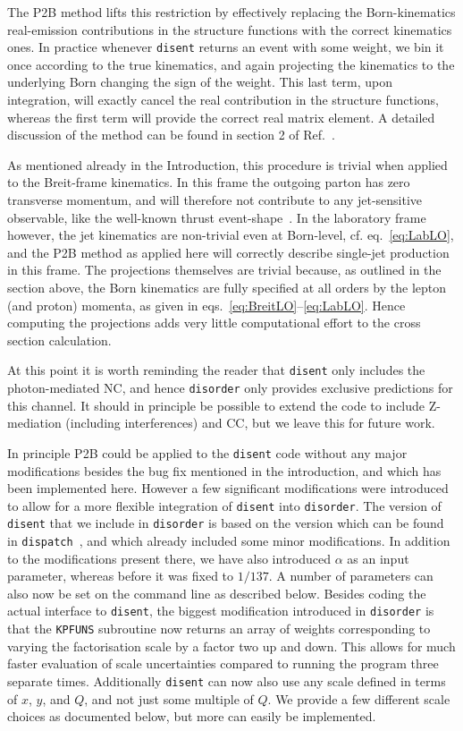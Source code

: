 \documentclass[submission, PhysCodeb]{SciPost_better_arXiv}
\newcommand{\disent}{{\tt disent}}
\newcommand{\disorder}{{\tt disorder}}
\begin{document}
The P2B method lifts this restriction by effectively replacing the
Born-kinematics real-emission contributions in the structure functions
with the correct kinematics ones. In practice whenever \disent{}
returns an event with some weight, we bin it once according to the
true kinematics, and again projecting the kinematics to the underlying
Born changing the sign of the weight. This last term, upon
integration, will exactly cancel the real contribution in the
structure functions, whereas the first term will provide the correct
real matrix element. A detailed discussion of the method can be found
in section 2 of Ref.~\cite{Currie:2018fgr}.

As mentioned already in the Introduction, this procedure is trivial
when applied to the Breit-frame kinematics. In this frame the outgoing
parton has zero transverse momentum, and will therefore not contribute
to any jet-sensitive observable, like the well-known thrust
event-shape~\cite{Antonelli:1999kx}. In the laboratory frame however,
the jet kinematics are non-trivial even at Born-level,
cf. eq.~\eqref{eq:LabLO}, and the P2B method as applied here will
correctly describe single-jet production in this frame. The
projections themselves are trivial because, as outlined in the section
above, the Born kinematics are fully specified at all orders by the
lepton (and proton) momenta, as given in
eqs.~\eqref{eq:BreitLO}--\eqref{eq:LabLO}. Hence computing the
projections adds very little computational effort to the cross section
calculation.

At this point it is worth reminding the reader that \disent{} only
includes the photon-mediated NC, and hence \disorder{} only provides
exclusive predictions for this channel. It should in principle be
possible to extend the code to include Z-mediation (including
interferences) and CC, but we leave this for future work.

In principle P2B could be applied to the \disent{} code without any
major modifications besides the bug fix mentioned in the introduction,
and which has been implemented here. However a few significant
modifications were introduced to allow for a more flexible integration
of \disent{} into \disorder{}. The version of \disent{} that we
include in \disorder{} is based on the version which can be found in
{\tt dispatch}~\cite{Dasgupta:2002dc}, and which already included some
minor modifications. In addition to the modifications present there,
we have also introduced $\alpha$ as an input parameter, whereas before
it was fixed to $1/137$. A number of parameters can also now be set on
the command line as described below. Besides coding the actual
interface to \disent{}, the biggest modification introduced in
\disorder{} is that the {\tt KPFUNS} subroutine now returns an array
of weights corresponding to varying the factorisation scale by a
factor two up and down. This allows for much faster evaluation of
scale uncertainties compared to running the program three separate
times. Additionally \disent{} can now also use any scale defined in
terms of $x$, $y$, and $Q$, and not just some multiple of $Q$. We
provide a few different scale choices as documented below, but more
can easily be implemented.
\end{document}
